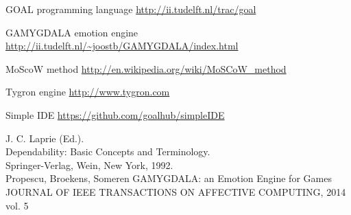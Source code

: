 \documentclass[11pt]{article}
\begin{document}
\clearpage

\printglossaries

\clearpage

\begin{thebibliography}{9}
	
	GOAL programming language
	\url{http://ii.tudelft.nl/trac/goal}
	
	GAMYGDALA emotion engine
	\url{http://ii.tudelft.nl/~joostb/GAMYGDALA/index.html}
	
	MoScoW method
	\url{http://en.wikipedia.org/wiki/MoSCoW_method }
	
	Tygron engine
	\url{http://www.tygron.com }
	
	Simple IDE
	\url{https://github.com/goalhub/simpleIDE }
	
	J. C. Laprie (Ed.).\\ 
	Dependability: Basic Concepts and Terminology. \\
	Springer-Verlag, Wein, New York, 1992.\\

	Propescu, Broekens, Someren
	GAMYGDALA: an Emotion Engine for Games
	JOURNAL OF IEEE TRANSACTIONS ON AFFECTIVE COMPUTING, 2014 vol. 5
	
	
\end{thebibliography}
\end{document}
